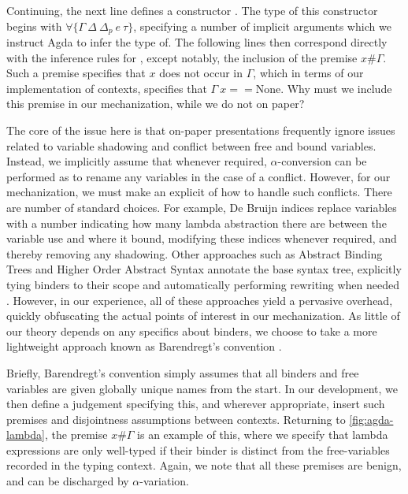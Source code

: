 Continuing, the next line defines a constructor \TLam. The type of this constructor begins with $\forall\{\Gamma~ \Delta~ \Delta_p~ e~ \tau\}$, specifying a number of implicit arguments which we instruct Agda to infer the type of. The following lines then correspond directly with the inference rules for \TLam, except notably, the inclusion of the premise $x \# \Gamma$. Such a premise specifies that $x$ does not occur  in $\Gamma$, which in terms of our implementation of contexts, specifies that $\Gamma~ x == \text{None}$. Why must we include this premise in our mechanization, while we do not on paper?

The core of the issue here is that on-paper presentations frequently ignore issues related to variable shadowing and conflict between free and bound variables. Instead, we implicitly assume that whenever required, $\alpha$-conversion can be performed as to rename any variables in the case of a conflict. However, for our mechanization, we must make an explicit of how to handle such conflicts. There are number of standard choices. For example, De Bruijn indices replace variables with a number indicating how many lambda abstraction there are between the variable use and where it bound, modifying these indices whenever required, and thereby removing any shadowing. Other approaches such as Abstract Binding Trees and Higher Order Abstract Syntax annotate the base syntax tree, explicitly tying binders to their scope and automatically performing rewriting when needed \cite{Harper2012}. However, in our experience, all of these approaches yield a pervasive overhead, quickly obfuscating the actual points of interest in our mechanization. As little of our theory depends on any specifics about binders, we choose to take a more lightweight approach known as Barendregt's convention \cite{DBLP:books/daglib/0067558, DBLP:conf/cade/UrbanBN07}.

Briefly, Barendregt's convention simply assumes that all binders and free variables are given globally unique names from the start. In our development, we then define a judgement specifying this, and wherever appropriate, insert such premises and disjointness assumptions between contexts. Returning to \autoref{fig:agda-lambda}, the premise $x \# \Gamma$ is an example of this, where we specify that lambda expressions are only well-typed if their binder is distinct from the free-variables recorded in the typing context. Again, we note that all these premises are benign, and can be discharged by $\alpha$-variation.

